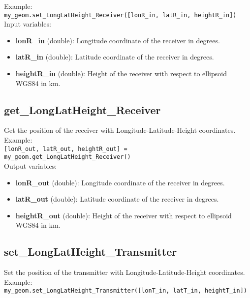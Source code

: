 Example:\\

\texttt{my\_geom.set\_LongLatHeight\_Receiver([lonR\_in, latR\_in, heightR\_in])}\\

Input variables:
\begin{itemize}
\item {\bf lonR\_in} (double): Longitude coordinate of the receiver in degrees.
\item {\bf latR\_in} (double): Latitude coordinate of the receiver in degrees.
\item {\bf heightR\_in} (double): Height of the receiver with respect to ellipsoid WGS84 in km.
\end{itemize}


\subsection{get\_LongLatHeight\_Receiver}

Get the position of the receiver with Longitude-Latitude-Height coordinates.\\

Example:\\

\texttt{[lonR\_out, latR\_out, heightR\_out] = my\_geom.get\_LongLatHeight\_Receiver()}\\

Output variables:
\begin{itemize}
\item {\bf lonR\_out} (double): Longitude coordinate of the receiver in degrees.
\item {\bf latR\_out} (double): Latitude coordinate of the receiver in degrees.
\item {\bf heightR\_out} (double): Height of the receiver with respect to ellipsoid WGS84 in km.
\end{itemize}

\subsection{set\_LongLatHeight\_Transmitter}

Set the position of the transmitter with Longitude-Latitude-Height coordinates.\\

Example:\\

\texttt{my\_geom.set\_LongLatHeight\_Transmitter([lonT\_in, latT\_in, heightT\_in])}\\

